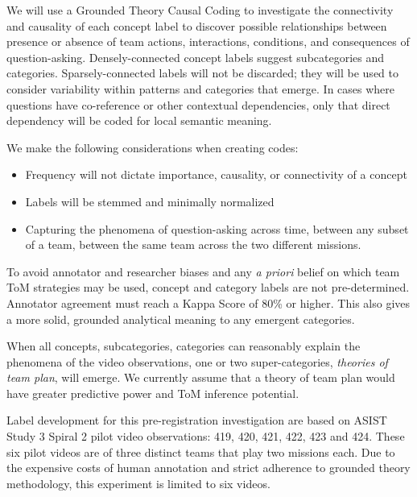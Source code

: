We will use a Grounded Theory Causal Coding to investigate the connectivity and causality of each concept label to discover possible relationships between presence or absence of team actions, interactions, conditions, and consequences of question-asking. Densely-connected concept labels suggest subcategories and categories. Sparsely-connected labels will not be discarded; they will be used to consider variability within patterns and categories that emerge. In cases where questions have co-reference or other contextual dependencies, only that direct dependency will be coded for local semantic meaning.

\vspace{15pt}

We make the following considerations when creating codes: 

\begin{itemize}
    \item Frequency will not dictate importance, causality, or connectivity of a concept
    \item Labels will be stemmed and minimally normalized 
    \item Capturing the phenomena of question-asking across time, between any subset of a team, between the same team across the two different missions. 
\end{itemize}

\vspace{15pt}

To avoid annotator and researcher biases and any \textit{a priori} belief on
which team ToM strategies may be used, concept and category labels are not
pre-determined. Annotator agreement must reach a Kappa Score of 80\% or higher. This also gives a more solid, grounded analytical meaning to any emergent categories. 

When all concepts, subcategories, categories can reasonably explain the phenomena of the video observations, one or two super-categories, \textit{theories of team plan}, will emerge. We currently assume that a theory of team plan would have greater predictive power and ToM inference potential. 

Label development for this pre-registration investigation are based on ASIST Study 3 Spiral 2 pilot video observations: 419, 420, 421, 422, 423 and 424. These six pilot videos are of three distinct teams that play two missions each. Due to the expensive costs of human annotation and strict adherence to grounded theory methodology, this experiment is limited to six videos. 

